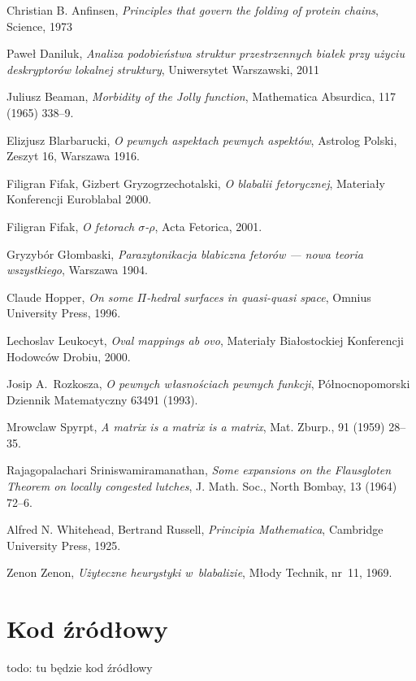 \documentclass[licencjacka]{pracamgr}
\begin{document}
\begin{thebibliography}{99}

 Christian B. Anfinsen, \textit{Principles that govern the folding of protein chains}, Science, 1973

 Paweł Daniluk, \textit{Analiza podobieństwa struktur przestrzennych białek przy użyciu deskryptorów lokalnej struktury}, Uniwersytet Warszawski, 2011

 Juliusz Beaman, \textit{Morbidity of the Jolly
    function}, Mathematica Absurdica, 117 (1965) 338--9.

 Elizjusz Blarbarucki, \textit{O pewnych
    aspektach pewnych aspektów}, Astrolog Polski, Zeszyt 16, Warszawa
  1916.

 Filigran Fifak, Gizbert Gryzogrzechotalski,
  \textit{O blabalii fetorycznej}, Materiały Konferencji Euroblabal
  2000.

 Filigran Fifak, \textit{O fetorach
    $\sigma$-$\rho$}, Acta Fetorica, 2001.

 Gryzybór Głombaski, \textit{Parazytonikacja
    blabiczna fetorów --- nowa teoria wszystkiego}, Warszawa 1904.

 Claude Hopper, \textit{On some $\Pi$-hedral
    surfaces in quasi-quasi space}, Omnius University Press, 1996.

 Lechoslav Leukocyt, \textit{Oval mappings ab ovo},
  Materiały Białostockiej Konferencji Hodowców Drobiu, 2000.

 Josip A.~Rozkosza, \textit{O pewnych własnościach
    pewnych funkcji}, Północnopomorski Dziennik Matematyczny 63491
  (1993).

 Mrowclaw Spyrpt, \textit{A matrix is a matrix
    is a matrix}, Mat. Zburp., 91 (1959) 28--35.

 Rajagopalachari Sriniswamiramanathan,
  \textit{Some expansions on the Flausgloten Theorem on locally
    congested lutches}, J. Math.  Soc., North Bombay, 13 (1964) 72--6.

 Alfred N. Whitehead, Bertrand Russell,
  \textit{Principia Mathematica}, Cambridge University Press, 1925.

 Zenon Zenon, \textit{Użyteczne heurystyki
    w~blabalizie}, Młody Technik, nr~11, 1969.

\end{thebibliography}

\chapter*{Kod źródłowy}

todo: tu będzie kod źródłowy
\end{document}
